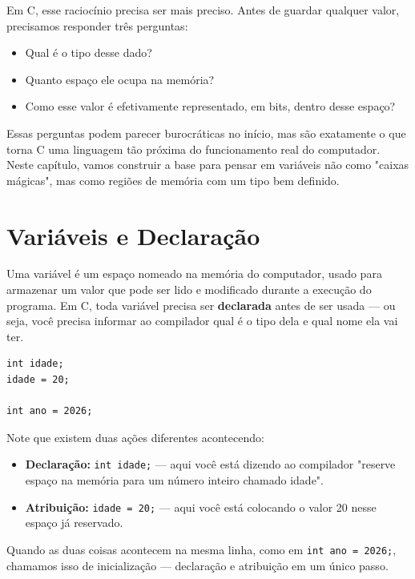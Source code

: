 \documentclass[12pt,a4paper,oneside]{extreport}
\begin{document}
Em C, esse raciocínio precisa ser mais preciso. Antes de guardar qualquer valor, precisamos responder três perguntas:

\begin{itemize}
    \item Qual é o tipo desse dado?
    \item Quanto espaço ele ocupa na memória?
    \item Como esse valor é efetivamente representado, em bits, dentro desse espaço?
\end{itemize}

Essas perguntas podem parecer burocráticas no início, mas são exatamente o que torna C uma linguagem tão próxima do funcionamento real do computador. Neste capítulo, vamos construir a base para pensar em variáveis não como "caixas mágicas", mas como regiões de memória com um tipo bem definido.

\section{Variáveis e Declaração}

Uma variável é um espaço nomeado na memória do computador, usado para armazenar um valor que pode ser lido e modificado durante a execução do programa. Em C, toda variável precisa ser \textbf{declarada} antes de ser usada — ou seja, você precisa informar ao compilador qual é o tipo dela e qual nome ela vai ter.

\begin{lstlisting}
int idade;
idade = 20;

int ano = 2026;
\end{lstlisting}

Note que existem duas ações diferentes acontecendo:

\begin{itemize}

    \item \textbf{Declaração:} \texttt{int idade;} — aqui você está dizendo ao compilador "reserve espaço na memória para um número inteiro chamado idade".
    \item \textbf{Atribuição:} \texttt{idade = 20;} — aqui você está colocando o valor 20 nesse espaço já reservado.

\end{itemize}

Quando as duas coisas acontecem na mesma linha, como em \texttt{int ano = 2026;}, chamamos isso de inicialização — declaração e atribuição em um único passo. \\
\end{document}
